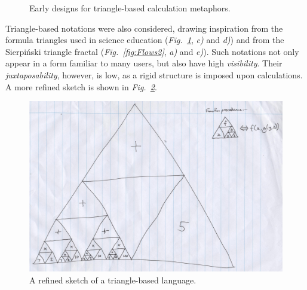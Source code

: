 \documentclass[12pt,twoside,notitlepage,xetex]{report}
\begin{document}
\begin{center}
\begin{figure}[H]
\begin{center}
{{\begin{center}
\end{center}}}
\end{center}
\caption{Early designs for triangle-based calculation metaphors.}
\label{fig:Tris1}
\end{figure}
\end{center}

Triangle-based notations were also considered, drawing inspiration from the formula triangles used in science education (\emph{Fig.~\ref{fig:Tris1}}, \emph{c)} and \emph{d)}) and from the Sierpiński triangle fractal (\emph{Fig.~\ref{fig:Flows2}}, \emph{a)} and \emph{e)}).  Such notations not only appear in a form familiar to many users, but also have high \emph{visibility}.  Their \emph{juxtaposability}, however, is low, as a rigid structure is imposed upon calculations.  A more refined sketch is shown in \emph{Fig.~\ref{fig:Tris2}}.

\begin{center}
\begin{figure}
\begin{center}
\includegraphics[width=\textwidth]{figs/mockups/sketches/31/31a.jpg}
\end{center}
\caption{A refined sketch of a triangle-based language.}
\label{fig:Tris2}
\end{figure}
\end{center}
\end{document}
